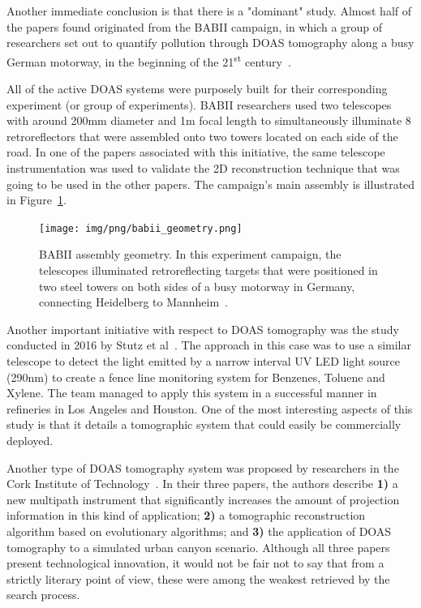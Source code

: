 Another immediate conclusion is that there is a "dominant" study. Almost
half of the papers found originated from the BABII campaign, in which a
group of researchers set out to quantify pollution through \gls{DOAS}
tomography along a busy German motorway, in the beginning of the
21\textsuperscript{st} century~\cite{Hartl2005, Hartl2006,
Laepple2004, Pundt2005, Pundt2006, Pundt2005a, Mettendorf2005}.

All of the active \gls{DOAS} systems were purposely built for their
corresponding experiment (or group of experiments). BABII researchers
used two telescopes with around 200mm diameter and 1m focal length to
simultaneously illuminate 8 retroreflectors that were assembled onto two
towers located on each side of the road. In one of the papers associated
with this initiative, the same telescope instrumentation was used to
validate the 2D reconstruction technique that was going to be used in
the other papers. The campaign's main assembly is illustrated in
Figure~\ref{fig:babii}.

\begin{figure}[htpb]
    \centering
    \texttt{[image: img/png/babii\_geometry.png]}
    \caption{BABII assembly geometry. In this experiment campaign, the
    telescopes illuminated retroreflecting targets that were positioned
    in two steel towers on both sides of a busy motorway in Germany,
    connecting Heidelberg to Mannheim~\cite{Pundt2005a}.}
    \label{fig:babii}
\end{figure}


Another important initiative with respect to \gls{DOAS} tomography was
the study conducted in 2016 by Stutz et al~\cite{Stutz2016}. The
approach in this case was to use a similar telescope to detect the light
emitted by a narrow interval UV LED light source (290nm) to create a
fence line monitoring system for Benzenes, Toluene and Xylene. The team
managed to apply this system in a successful manner in refineries in Los
Angeles and Houston. One of the most interesting aspects of this study
is that it details a tomographic system that could easily be
commercially deployed.

Another type of \gls{DOAS} tomography system was proposed by researchers
in the Cork Institute of Technology~\cite{ODriscoll2003,ODriscoll2003a,
Murphy2003}.  In their three papers, the authors describe \textbf{1)} a
new multipath instrument that significantly increases the amount of
projection information in this kind of application; \textbf{2)} a
tomographic reconstruction algorithm based on evolutionary algorithms;
and \textbf{3)} the application of \gls{DOAS} tomography to a simulated
urban canyon scenario. Although all three papers present technological
innovation, it would not be fair not to say that from a strictly
literary point of view, these were among the weakest retrieved by the
search process.

